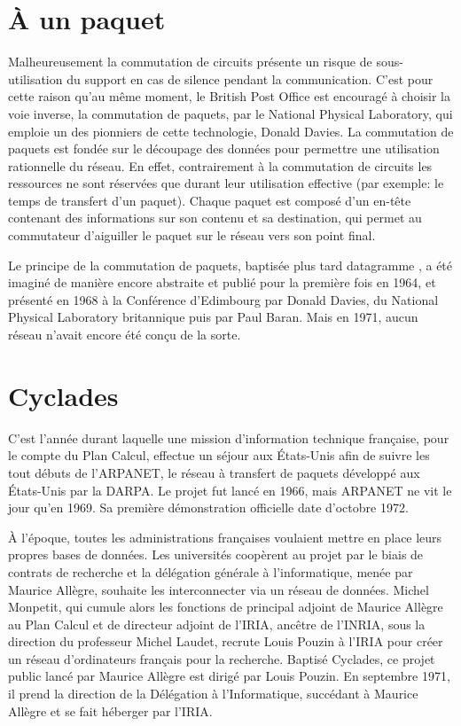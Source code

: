 \documentclass[12pt]{report}
\begin{document}
\section{À un paquet}

Malheureusement la commutation de circuits présente un risque de sous-utilisation du support en cas de \og silence \fg pendant la communication.
C'est pour cette raison qu'au même moment, le British Post Office est encouragé à choisir la voie inverse, la commutation de paquets, par le National Physical Laboratory, qui emploie un des pionniers de cette technologie, Donald Davies. La commutation de paquets est fondée sur le découpage des données pour permettre une utilisation rationnelle du réseau. En effet, contrairement à la commutation de circuits les ressources ne sont réservées que durant leur utilisation effective (par exemple: le temps de transfert d'un paquet). Chaque paquet est composé d'un en-tête contenant des informations sur son contenu et sa destination, qui permet au commutateur d'aiguiller le paquet sur le réseau vers son point final\cite{wikicp}.

Le principe de la commutation de paquets, baptisée plus tard \og datagramme \fg, a été imaginé de manière encore abstraite et publié pour la première fois en 1964, et présenté en 1968 à la Conférence d'Edimbourg par Donald Davies, du National Physical Laboratory britannique puis par Paul Baran. Mais en 1971, aucun réseau n'avait encore été conçu de la sorte.

\section{Cyclades}


C'est l'année durant laquelle une mission d'information technique française, pour le compte du Plan Calcul, effectue un séjour aux États-Unis afin de suivre les tout débuts de l'\gls{ARPANET}, le réseau à transfert de paquets développé aux États-Unis par la \gls{DARPA}. Le projet fut lancé en 1966, mais ARPANET ne vit le jour qu'en 1969. Sa première démonstration officielle date d'octobre 1972\cite{wikiarpa}.

À l'époque, toutes les administrations françaises voulaient mettre en place leurs propres bases de données. Les universités coopèrent au projet par le biais de contrats de recherche et la délégation générale à l'informatique, menée par Maurice Allègre, souhaite les interconnecter via un réseau de données. Michel Monpetit, qui cumule alors les fonctions de principal adjoint de Maurice Allègre au Plan Calcul et de directeur adjoint de l'IRIA, ancêtre de l'\gls{INRIA}, sous la direction du professeur Michel Laudet, recrute Louis Pouzin à l'IRIA pour créer un réseau d'ordinateurs français pour la recherche. Baptisé Cyclades, ce projet public lancé par Maurice Allègre est dirigé par Louis Pouzin. En septembre 1971, il prend la direction de la Délégation à l’Informatique, succédant à Maurice Allègre et se fait héberger par l’IRIA\cite{wikicyc}.
\end{document}
